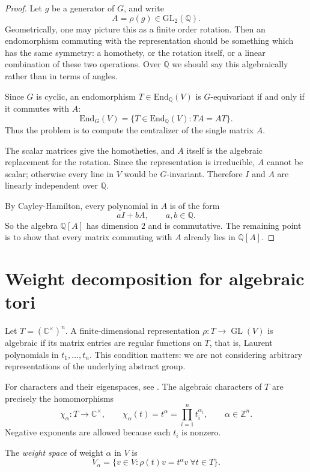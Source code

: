\begin{proof}
Let $g$ be a generator of $G$, and write
$$
A=\rho(g)\in \text{GL}_2(\mathbb{Q}).
$$
Geometrically, one may picture this as a
finite order rotation. Then an endomorphism
commuting with the representation should be
something which has the same symmetry: a
homothety, or the rotation itself, or a
linear combination of these two operations.
Over $\mathbb{Q}$ we should say this
algebraically rather than in terms of angles.

Since $G$ is cyclic, an endomorphism
$T\in\text{End}_{\mathbb{Q}}(V)$ is
$G$-equivariant if and only if it commutes
with $A$:
$$
\text{End}_G(V)=
\{T\in\text{End}_{\mathbb{Q}}(V):TA=AT\}.
$$
Thus the problem is to compute the
centralizer of the single matrix $A$.

The scalar matrices give the homotheties,
and $A$ itself is the algebraic replacement
for the rotation. Since the representation is
irreducible, $A$ cannot be scalar; otherwise
every line in $V$ would be $G$-invariant.
Therefore $I$ and $A$ are linearly
independent over $\mathbb{Q}$.

By Cayley-Hamilton, every polynomial in $A$
is of the form
$$
aI+bA,\qquad a,b\in\mathbb{Q}.
$$
So the algebra $\mathbb{Q}[A]$ has dimension
$2$ and is commutative. The remaining point
is to show that every matrix commuting with
$A$ already lies in $\mathbb{Q}[A]$.
\end{proof}


\section{Weight decomposition for
algebraic tori}
\label{section-torus-weights}

\noindent
Let $T=(\mathbb{C}^{\times})^n$.
A finite-dimensional representation
$\rho:T\to\operatorname{GL}(V)$ is
algebraic if its matrix entries are
regular functions on $T$, that is,
Laurent polynomials in $t_1,\ldots,t_n$.
This condition matters: we are not
considering arbitrary representations
of the underlying abstract group.

For characters and their eigenspaces,
see \cite[Section 4g and
Chapter 12, Sections a--d]{milne-ag-2022}.
The algebraic characters of $T$ are
precisely the homomorphisms
$$
\chi_\alpha:T\longrightarrow
\mathbb{C}^{\times},
\qquad
\chi_\alpha(t)=t^\alpha
=\prod_{i=1}^n t_i^{\alpha_i},
\qquad \alpha\in\mathbb{Z}^n.
$$
Negative exponents are allowed because
each $t_i$ is nonzero.

\begin{definition}
\label{definition-torus-weight-space}
The \emph{weight space} of weight
$\alpha$ in $V$ is
$$
V_\alpha=
\{v\in V:\rho(t)v=t^\alpha v
\ \forall t\in T\}.
$$
\end{definition}

